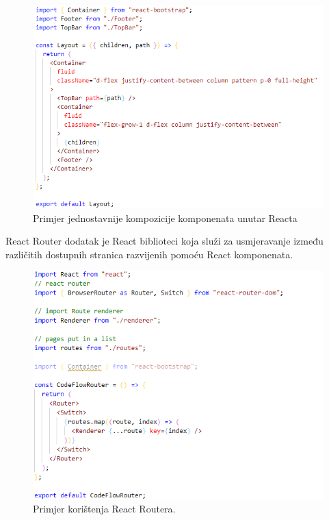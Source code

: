 \documentclass[times, utf8, zavrsni]{fer}
\begin{document}
		\begin{figure}[H]
			\centering
			\includegraphics[width=\linewidth]{pictures/prikazi/React.png}
			\caption{Primjer jednostavnije kompozicije komponenata unutar Reacta}
			\label{fig:react}
		\end{figure}
		React Router dodatak je React biblioteci koja služi za usmjeravanje između različitih dostupnih  stranica razvijenih pomoću React komponenata.
		\begin{figure}[H]
			\centering
			\includegraphics[width=\linewidth]{pictures/prikazi/ReactRouter.png}
			\caption{Primjer korištenja React Routera.}
			\label{fig:react-router}
		\end{figure}
	
\end{document}
